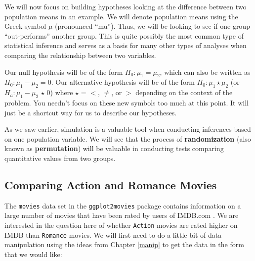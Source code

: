 \documentclass[]{tufte-book}
\newenvironment{Shaded}{\begin{snugshade}}{\end{snugshade}}
\newcommand{\KeywordTok}[1]{\textcolor[rgb]{0.13,0.29,0.53}{\textbf{{#1}}}}
\newcommand{\StringTok}[1]{\textcolor[rgb]{0.31,0.60,0.02}{{#1}}}
\newcommand{\NormalTok}[1]{{#1}}
\theoremstyle{definition}
\theoremstyle{definition}
\theoremstyle{remark}
\begin{document}
We will now focus on building hypotheses looking at the difference
between two population means in an example. We will denote population
means using the Greek symbol \(\mu\) (pronounced ``mu''). Thus, we will
be looking to see if one group ``out-performs'' another group. This is
quite possibly the most common type of statistical inference and serves
as a basis for many other types of analyses when comparing the
relationship between two variables.

Our null hypothesis will be of the form \(H_0: \mu_1 = \mu_2\), which
can also be written as \(H_0: \mu_1 - \mu_2 = 0\). Our alternative
hypothesis will be of the form \(H_0: \mu_1 \star \mu_2\) (or
\(H_a: \mu_1 - \mu_2 \, \star \, 0\)) where \(\star\) = \(<\), \(\ne\),
or \(>\) depending on the context of the problem. You needn't focus on
these new symbols too much at this point. It will just be a shortcut way
for us to describe our hypotheses.

As we saw earlier, simulation is a valuable tool when conducting
inferences based on one population variable. We will see that the
process of \textbf{randomization} (also known as \textbf{permutation})
will be valuable in conducting tests comparing quantitative values from
two groups.

\subsection{Comparing Action and Romance
Movies}\label{comparing-action-and-romance-movies}

The \texttt{movies} data set in the \texttt{ggplot2movies} package
contains information on a large number of movies that have been rated by
users of IMDB.com \citep{R-ggplot2movies}. We are interested in the
question here of whether \texttt{Action} movies are rated higher on IMDB
than \texttt{Romance} movies. We will first need to do a little bit of
data manipulation using the ideas from Chapter \ref{manip} to get the
data in the form that we would like:

\begin{Shaded}
\end{Shaded}
\end{document}
